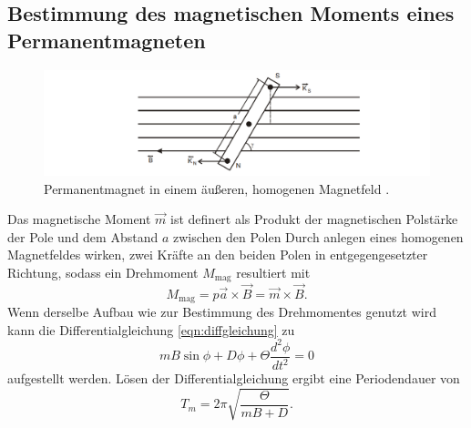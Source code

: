 \subsection{Bestimmung des magnetischen Moments eines Permanentmagneten} 
    \begin{figure}
        \centering
        \includegraphics[width=\textwidth]{content/magnet.png}
        \caption{Permanentmagnet in einem äußeren, homogenen Magnetfeld \cite[103]{V102}.}
        \label{fig:magnet}
    \end{figure}
    Das magnetische Moment $\vec{m}$ ist definert als Produkt der magnetischen Polstärke der Pole und dem Abstand $a$ zwischen den Polen
    Durch anlegen eines homogenen Magnetfeldes wirken, zwei Kräfte an den beiden Polen in 
    entgegengesetzter Richtung, sodass ein Drehmoment $M_\text{mag}$ resultiert mit
    \begin{equation}
    \label{eqn:magdrehmoment}
    M_\text{mag} = p \vec{a} \times \vec{B} = \vec{m} \times \vec {B}.
    \end{equation}
    Wenn derselbe Aufbau wie zur Bestimmung des Drehmomentes genutzt 
    wird kann die Differentialgleichung \eqref{eqn:diffgleichung} zu
    \begin{equation}
    \label{eqn:magdiff}
    m B \sin \phi + D \phi + \Theta \frac{d^2\phi}{dt^2} = 0 
    \end{equation}
    aufgestellt werden.
    Lösen der Differentialgleichung ergibt eine Periodendauer von
    \begin{equation}
    \label{eqn:Periodendauermagnet}
    T_m = 2 \pi \sqrt{\frac{\Theta}{m B + D}}.
    \end{equation}

